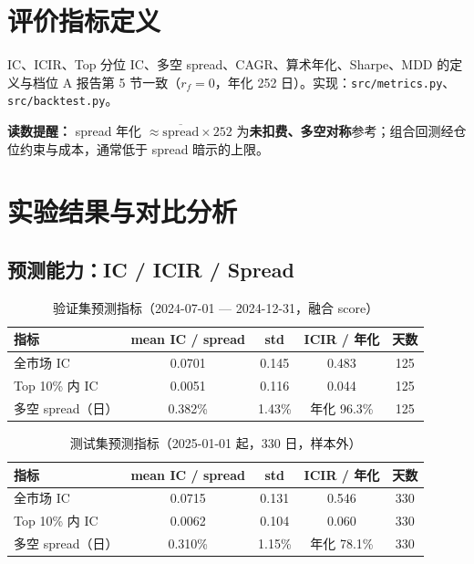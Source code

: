 \documentclass[UTF8,a4paper,12pt]{ctexart}
\begin{document}
\section{评价指标定义}

IC、ICIR、Top 分位 IC、多空 spread、CAGR、算术年化、Sharpe、MDD 的定义与档位 A 报告第 5 节一致（$r_f=0$，年化 252 日）。实现：\texttt{src/metrics.py}、\texttt{src/backtest.py}。

\textbf{读数提醒：} spread 年化 $\approx \overline{\mathrm{spread}}\times 252$ 为\textbf{未扣费、多空对称}参考；组合回测经仓位约束与成本，通常低于 spread 暗示的上限。

\section{实验结果与对比分析}

\subsection{预测能力：IC / ICIR / Spread}

\begin{table}[H]
\centering
\caption{验证集预测指标（2024-07-01 --- 2024-12-31，融合 score）}
\label{tab:ic-valid}
\begin{tabular}{lcccc}
\toprule
\textbf{指标} & \textbf{mean IC / spread} & \textbf{std} & \textbf{ICIR / 年化} & \textbf{天数} \\
\midrule
全市场 IC     & 0.0701 & 0.145 & 0.483 & 125 \\
Top 10\% 内 IC & 0.0051 & 0.116 & 0.044 & 125 \\
多空 spread（日） & 0.382\% & 1.43\% & 年化 96.3\% & 125 \\
\bottomrule
\end{tabular}
\end{table}

\begin{table}[H]
\centering
\caption{测试集预测指标（2025-01-01 起，330 日，样本外）}
\label{tab:ic-test}
\begin{tabular}{lcccc}
\toprule
\textbf{指标} & \textbf{mean IC / spread} & \textbf{std} & \textbf{ICIR / 年化} & \textbf{天数} \\
\midrule
全市场 IC     & 0.0715 & 0.131 & 0.546 & 330 \\
Top 10\% 内 IC & 0.0062 & 0.104 & 0.060 & 330 \\
多空 spread（日） & 0.310\% & 1.15\% & 年化 78.1\% & 330 \\
\bottomrule
\end{tabular}
\end{table}
\end{document}
